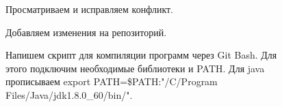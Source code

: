 \begin{figure}[h]
	\caption{Просматриваем и исправляем конфликт.}
	\label{ris:image}
\end{figure}
\hfill
\begin{figure}[h]
	\caption{Добавляем изменения на репозиторий.}
	\label{ris:image}
\end{figure}
\hfill
\begin{figure}[h!]
	\caption{Напишем скрипт для компиляции программ через Git Bash.
		Для этого подключим необходимые библиотеки и  PATH. Для java прописываем export PATH=\$PATH:"/C/Program Files/Java/jdk1.8.0\_60/bin/".}
	\label{ris:image}
\end{figure}

